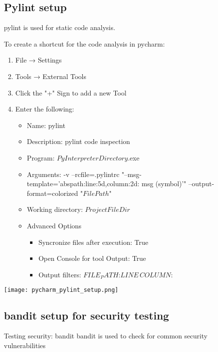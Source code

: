 \subsection{Pylint setup}

pylint is used for static code analysis.

To create a shortcut for the code analysis in pycharm:

\begin{enumerate}
    \item File → Settings
    \item Tools → External Tools
    \item Click the "+" Sign to add a new Tool
    \item Enter the following:
    \begin{itemize}
        \item Name: pylint
        \item Description: pylint code inspection
        \item Program: $PyInterpreterDirectory$\pylint.exe
        \item Arguments: -v --rcfile=.pylintrc "--msg-template='{abspath}:{line:5d},{column:2d}: {msg} ({symbol})'" --output-format=colorized "$FilePath$"
        \item Working directory: $ProjectFileDir$
        \item Advanced Options
        \begin{itemize}
            \item Syncronize files after execution: True
            \item Open Console for tool Output: True
            \item Output filters: $FILE_PATH$:\s*$LINE$\,\s*$COLUMN$:
        \end{itemize}
    \end{itemize}
\end{enumerate}

\texttt{[image:  pycharm\_pylint\_setup.png]}



\subsection{bandit setup for security testing}

Testing security: bandit
bandit is used to check for common security vulnerabilities

